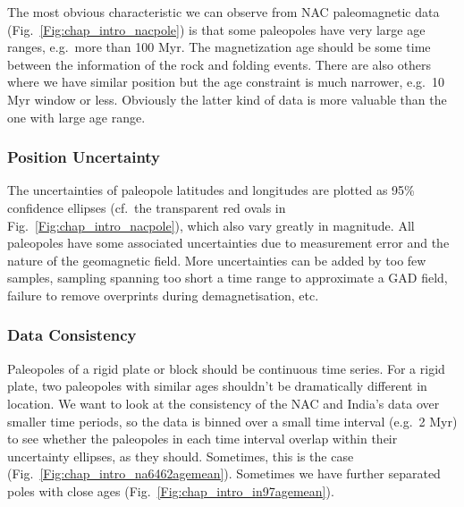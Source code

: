The most obvious characteristic we can observe from NAC paleomagnetic data
(Fig.~\ref{Fig:chap_intro_nacpole}) is that some paleopoles have very large age
ranges, e.g.\ more than 100 Myr. The magnetization age should be some time
between the information of the rock and folding events. There are also others
where we have similar position but the age constraint is much narrower, e.g.\ 10
Myr window or less. Obviously the latter kind of data is more valuable than the
one with large age range.

\subsubsection{Position Uncertainty}\label{sec:posu}

The uncertainties of paleopole latitudes and longitudes are plotted as 95\%
confidence ellipses (cf.\ the transparent red ovals in
Fig.~\ref{Fig:chap_intro_nacpole}), which also vary greatly in magnitude. All
paleopoles have some associated uncertainties due to measurement error and the
nature of the geomagnetic field. More uncertainties can be added by too few
samples, sampling spanning too short a time range to approximate a GAD field,
failure to remove overprints during demagnetisation, etc.

\subsubsection{Data Consistency}\label{sec:datcons}

Paleopoles of a rigid plate or block should be continuous time series. For a
rigid plate, two paleopoles with similar ages shouldn't be dramatically
different in location. We want to look at the consistency of the NAC and India's
data over smaller time periods, so the data is binned over a small time interval
(e.g.\ 2 Myr) to see whether the paleopoles in each time interval overlap within
their uncertainty ellipses, as they should. Sometimes, this is the case
(Fig.~\ref{Fig:chap_intro_na6462agemean}). Sometimes we have further separated
poles with close ages (Fig.~\ref{Fig:chap_intro_in97agemean}).

